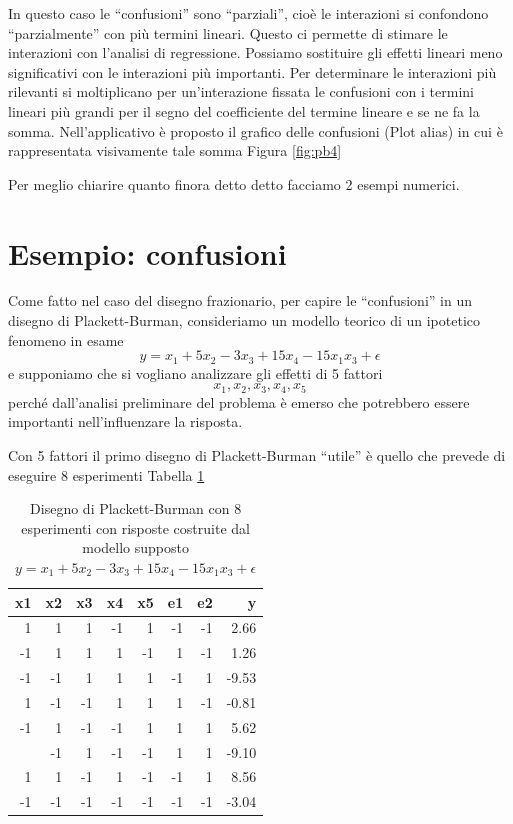 \documentclass[
  11pt,
]{book}
\begin{document}
In questo caso le ``confusioni'' sono ``parziali'', cioè le interazioni si confondono ``parzialmente'' con più termini lineari. Questo ci permette di stimare le interazioni con l'analisi di regressione. Possiamo sostituire gli effetti lineari meno significativi con le interazioni più importanti. Per determinare le interazioni più rilevanti si moltiplicano per un'interazione fissata le confusioni con i termini lineari più grandi per il segno del coefficiente del termine lineare e se ne fa la somma. Nell'applicativo è proposto il grafico delle confusioni (Plot alias) in cui è rappresentata visivamente tale somma Figura \ref{fig:pb4}

Per meglio chiarire quanto finora detto detto facciamo 2 esempi numerici.

\hypertarget{esempio-confusioni-1}{%
\section{Esempio: confusioni}\label{esempio-confusioni-1}}

Come fatto nel caso del disegno frazionario, per capire le ``confusioni'' in un disegno di Plackett-Burman, consideriamo un modello teorico di un ipotetico fenomeno in esame
\[
y=x_1+5x_2-3x_3+15x_4-15x_1x_3+\epsilon
\]
e supponiamo che si vogliano analizzare gli effetti di 5 fattori
\[
x_1,x_2,x_3,x_4,x_5
\]
perché dall'analisi preliminare del problema è emerso che potrebbero essere importanti nell'influenzare la risposta.

Con 5 fattori il primo disegno di Plackett-Burman ``utile'' è quello che prevede di eseguire 8 esperimenti Tabella \ref{tab:pbes1}

\begin{table}

\caption{\label{tab:pbes1}Disegno di Plackett-Burman con 8 esperimenti con risposte costruite dal modello supposto
            $y=x_1+5x_2-3x_3+15x_4-15x_1x_3+\epsilon$ }
\centering
\begin{tabular}[t]{rrrrrrrr}
\toprule
x1 & x2 & x3 & x4 & x5 & e1 & e2 & y\\
\midrule
1 & 1 & 1 & -1 & 1 & -1 & -1 & 2.66\\
-1 & 1 & 1 & 1 & -1 & 1 & -1 & 1.26\\
-1 & -1 & 1 & 1 & 1 & -1 & 1 & -9.53\\
1 & -1 & -1 & 1 & 1 & 1 & -1 & -0.81\\
-1 & 1 & -1 & -1 & 1 & 1 & 1 & 5.62\\
\addlinespace
1 & -1 & 1 & -1 & -1 & 1 & 1 & -9.10\\
1 & 1 & -1 & 1 & -1 & -1 & 1 & 8.56\\
-1 & -1 & -1 & -1 & -1 & -1 & -1 & -3.04\\
\bottomrule
\end{tabular}
\end{table}
\end{document}
